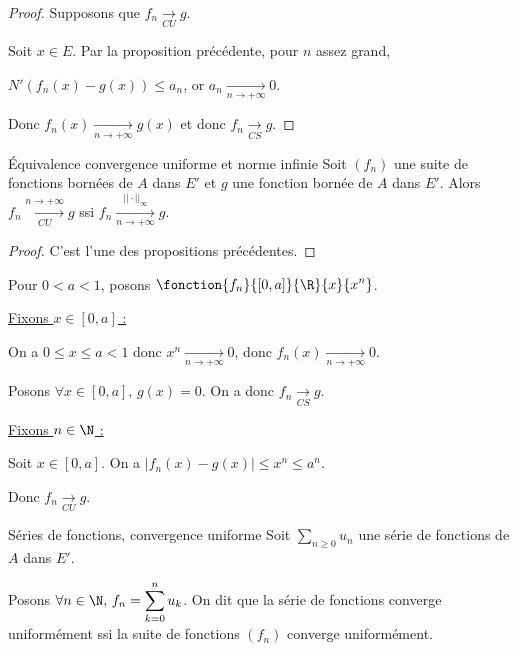 
\begin{proof}
    Supposons que $f_n \xrightarrow[CU]{} g$.

    Soit $x \in E$. Par la proposition précédente, pour $n$ assez grand,

    $N'(f_n(x) - g(x)) \leqslant a_n$, or $a_n \xrightarrow[n\to +\infty]{} 0$.

    Donc $f_n(x) \xrightarrow[n\to +\infty]{} g(x)$ et donc $f_n \xrightarrow[CS]{} g$.
\end{proof}

\begin{proposition}{Équivalence convergence uniforme et norme infinie}{}
    Soit $(f_n)$ une suite de fonctions bornées de $A$ dans $E'$ et $g$ une fonction bornée de $A$ dans $E'$.
    Alors $f_n \xrightarrow[CU]{n \to + \infty} g$ ssi $\displaystyle f_n \xrightarrow[n \to + \infty]{||\cdot ||_{\infty}} g$.
\end{proposition}

\begin{proof}
    C'est l'une des propositions précédentes.
\end{proof}

\begin{exemple}
    Pour $0 < a < 1$, posons $\displaystyle \fonction{f_n}{[0, a]}{\R}{x}{x^n}$.

    \uline{Fixons $x \in [0, a]$ :}

    \avspace On a $0 \leqslant x \leqslant a < 1$ donc $x^n \xrightarrow[n\to +\infty]{} 0$, donc 
    $f_n(x) \xrightarrow[n\to +\infty]{} 0$.

    Posons $\forall x \in [0, a], \, g(x) = 0$. On a donc $f_n \xrightarrow[CS]{} g$.

    \uline{Fixons $n \in \N$ :} 

    \avspace Soit $x \in [0, a]$. On a $\displaystyle |f_n(x) - g(x)| \leqslant x^n \leqslant a^n$.

    Donc $f_n \xrightarrow[CU]{} g$.
\end{exemple}


\begin{definition}{Séries de fonctions, convergence uniforme}{}
    Soit $ \sum_{n \geqslant 0} u_n$ une série de fonctions de $A$ dans $E'$. 

    Posons $\displaystyle \forall n \in \N, \, f_n = \sum_{k = 0}^n u_k$. On dit que la série de fonctions converge 
    uniformément ssi la suite de fonctions $(f_n)$ converge uniformément.
\end{definition}

